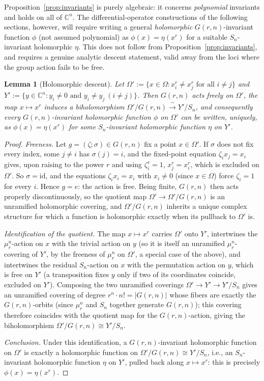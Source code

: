 \documentclass[10pt,a4paper]{amsart}
\newtheorem{lemma}[theorem]{Lemma}
\newcommand{\CC}{\mathbb{C}}
\begin{document}
Proposition~\ref{prop:invariants} is purely algebraic: it concerns \emph{polynomial} invariants and holds on all of $\CC^n$. The differential-operator constructions of the following sections, however, will require writing a general \emph{holomorphic} $G(r,n)$-invariant function $\phi$ (not assumed polynomial) as $\phi(x)=\eta(x^r)$ for a suitable $S_n$-invariant holomorphic $\eta$. This does not follow from Proposition~\ref{prop:invariants}, and requires a genuine analytic descent statement, valid away from the loci where the group action fails to be free.

\begin{lemma}[Holomorphic descent]\label{lem:descent}
Let $\Omega':=\{x\in\Omega : x_i^r\ne x_j^r \text{ for all } i\ne j\}$ and $Y':=\{y\in\CC^n : y_i\ne0 \text{ and } y_i\ne y_j\ (i\ne j)\}$. Then $G(r,n)$ acts freely on $\Omega'$, the map $x\mapsto x^r$ induces a biholomorphism $\Omega'/G(r,n)\xrightarrow{\ \sim\ }Y'/S_n$, and consequently every $G(r,n)$-invariant holomorphic function $\phi$ on $\Omega'$ can be written, uniquely, as $\phi(x)=\eta(x^r)$ for some $S_n$-invariant holomorphic function $\eta$ on $Y'$.
\end{lemma}

\begin{proof}
\emph{Freeness.} Let $g=(\zeta;\sigma)\in G(r,n)$ fix a point $x\in\Omega'$. If $\sigma$ does not fix every index, some $j\ne i$ has $\sigma(j)=i$, and the fixed-point equation $\zeta_ix_j=x_i$ gives, upon raising to the power $r$ and using $\zeta_i^r=1$, $x_j^r=x_i^r$, which is excluded on $\Omega'$. So $\sigma=\mathrm{id}$, and the equations $\zeta_ix_i=x_i$ with $x_i\ne0$ (since $x\in\Omega$) force $\zeta_i=1$ for every $i$. Hence $g=e$: the action is free. Being finite, $G(r,n)$ then acts properly discontinuously, so the quotient map $\Omega'\to\Omega'/G(r,n)$ is an unramified holomorphic covering, and $\Omega'/G(r,n)$ inherits a unique complex structure for which a function is holomorphic exactly when its pullback to $\Omega'$ is.

\emph{Identification of the quotient.} The map $x\mapsto x^r$ carries $\Omega'$ onto $Y'$, intertwines the $\mu_r^n$-action on $x$ with the trivial action on $y$ (so it is itself an unramified $\mu_r^n$-covering of $Y'$, by the freeness of $\mu_r^n$ on $\Omega'$, a special case of the above), and intertwines the residual $S_n$-action on $x$ with the permutation action on $y$, which is free on $Y'$ (a transposition fixes $y$ only if two of its coordinates coincide, excluded on $Y'$). Composing the two unramified coverings $\Omega'\to Y'\to Y'/S_n$ gives an unramified covering of degree $r^n\cdot n!=|G(r,n)|$ whose fibers are exactly the $G(r,n)$-orbits (since $\mu_r^n$ and $S_n$ together generate $G(r,n)$); this covering therefore coincides with the quotient map for the $G(r,n)$-action, giving the biholomorphism $\Omega'/G(r,n)\cong Y'/S_n$.

\emph{Conclusion.} Under this identification, a $G(r,n)$-invariant holomorphic function on $\Omega'$ is exactly a holomorphic function on $\Omega'/G(r,n)\cong Y'/S_n$, i.e., an $S_n$-invariant holomorphic function $\eta$ on $Y'$, pulled back along $x\mapsto x^r$: this is precisely $\phi(x)=\eta(x^r)$.
\end{proof}
\end{document}
